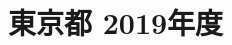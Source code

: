 \documentclass[../../hsm_tok_q.tex]{subfiles}
\begin{document}
    \section{東京都 2019年度}
    \subsection{　}
    
    \newpage
    \subsection{　}
    
    \newpage
    \subsection{　}
    
    \newpage
    \subsection{　}
    
    \newpage
    \subsection{　}
    
\end{document}
